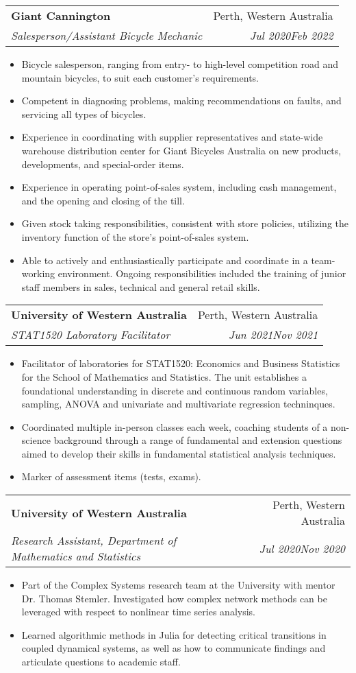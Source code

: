 \documentclass[letterpaper,10.8pt]{article}
\makeatletter
\newcommand{\resumeItem}[2]{
  \item\small{
    \textbf{#1}{#2 \vspace{-2pt}}
  }
}
\newcommand{\resumeSubheading}[4]{
  \vspace{-1pt}\item
    \begin{tabular*}{0.97\textwidth}{l@{\extracolsep{\fill}}r}
      \textbf{#1} & #2 \\
      \textit{\small#3} & \textit{\small #4} \\
    \end{tabular*}\vspace{-5pt}
}
\newcommand{\resumeItemListStart}{\begin{itemize}}
\newcommand{\resumeItemListEnd}{\end{itemize}\vspace{-5pt}}
\makeatother
\begin{document}
    \resumeSubheading
		{Giant Cannington}{Perth, Western Australia}
		{Salesperson/Assistant Bicycle Mechanic}{Jul 2020\textendash Feb 2022}
		\resumeItemListStart
        \resumeItem{}{Bicycle salesperson, ranging from entry- to high-level competition road and mountain bicycles, to suit each customer's requirements.}
        \resumeItem{}{Competent in diagnosing problems, making recommendations on faults, and servicing all types of bicycles.}
        \resumeItem{}{Experience in coordinating with supplier representatives and state-wide warehouse distribution center for Giant Bicycles Australia on new products, developments, and special-order items.}
        \resumeItem{}{Experience in operating point-of-sales system, including cash management, and the opening and closing of the till.}
        \resumeItem{}{Given stock taking responsibilities, consistent with store policies, utilizing the inventory function of the store’s point-of-sales system.}
        \resumeItem{}{Able to actively and enthusiastically participate and coordinate in a team-working environment. Ongoing responsibilities included the training of junior staff members in sales, technical and general retail skills.}
    \resumeItemListEnd

    \resumeSubheading
    {University of Western Australia}{Perth, Western Australia}
    {STAT1520 Laboratory Facilitator}{Jun 2021\textendash Nov 2021}
    \resumeItemListStart
    \resumeItem{}{Facilitator of laboratories for STAT1520: Economics and Business Statistics for the School of Mathematics and Statistics. The unit establishes a foundational understanding in discrete and continuous random variables, sampling, ANOVA and univariate and multivariate regression techninques.}
    \resumeItem{}{Coordinated multiple in-person classes each week, coaching students of a non-science background through a range of fundamental and extension questions aimed to develop their skills in fundamental statistical analysis techniques.}
    \resumeItem{}{Marker of assessment items (tests, exams).}
    \resumeItemListEnd
    
    \resumeSubheading
    {University of Western Australia}{Perth, Western Australia}
    {Research Assistant, Department of Mathematics and Statistics}{Jul 2020\textendash Nov 2020}
    \resumeItemListStart
    \resumeItem{}{Part of the Complex Systems research team at the University with mentor Dr. Thomas Stemler. Investigated how complex network methods can be leveraged with respect to nonlinear time series analysis.}
    \resumeItem{}{Learned algorithmic methods in Julia for detecting critical transitions in coupled dynamical systems, as well as how to communicate findings and articulate questions to academic staff.}
    \resumeItemListEnd
    
\end{document}
